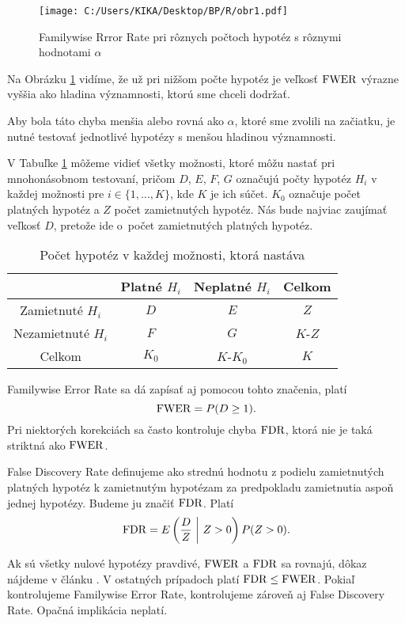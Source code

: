 \begin{figure}[h!]
  \centering
  \texttt{[image: C:/Users/KIKA/Desktop/BP/R/obr1.pdf]}
  \captionsetup{justification=centering}
  \caption{Familywise Rrror Rate pri rôznych počtoch hypotéz s rôznymi hodnotami $\alpha$}
  \label{obr02:1}
\end{figure}

Na Obrázku \ref{obr02:1} vidíme, že už pri nižšom počte hypotéz je veľkosť ${\rm FWER}$ 
výrazne vyššia ako hladina významnosti, ktorú sme chceli dodržať. 

Aby bola táto chyba menšia alebo rovná ako $\alpha$, ktoré sme zvolili na začiatku, 
je nutné testovať jednotlivé hypotézy s menšou hladinou významnosti. 

V Tabuľke \ref{tab02:1} môžeme vidieť všetky možnosti, ktoré môžu nastať pri mnohonásobnom testovaní, 
pričom $D$, $E$, $F$, $G$ označujú počty hypotéz $H_i$ v každej možnosti pre $i \in \{1, \dots, K\}$, kde $K$ je ich súčet. 
$K_0$ označuje počet platných hypotéz a $Z$ počet zamietnutých hypotéz. 
Nás bude najviac zaujímať veľkosť $D$, pretože ide o~počet zamietnutých platných hypotéz. 

\begin{table}[h!]
    \centering
    \begin{tabular}{|c|c|c|c|}
      \hline
       & Platné $H_i$ & Neplatné $H_i$ & Celkom \\ \hline
      Zamietnuté $H_i$ & $D$ & $E$ & $Z$ \\ \hline
      Nezamietnuté $H_i$ & $F$ & $G$ & $K$-$Z$ \\ \hline
      Celkom & $K_0$ & $K$-$K_0$ & $K$ \\ \hline
    \end{tabular}
    \captionsetup{justification=centering}
    \caption{Počet hypotéz v každej možnosti, ktorá nastáva}
    \label{tab02:1}
\end{table}

Familywise Error Rate sa dá zapísať aj pomocou tohto značenia, platí 
$$ {\rm FWER} = P (D \geq 1). $$ 
Pri niektorých korekciách sa často kontroluje chyba ${\rm FDR}$, ktorá nie je taká striktná ako ${\rm FWER}$. 

\begin{definicia}\label{def6}
  False Discovery Rate definujeme ako strednú hodnotu z podielu zamietnutých platných hypotéz k zamietnutým hypotézam  
  za predpokladu zamietnutia aspoň jednej hypotézy. Budeme ju značiť ${\rm FDR}$. 
  Platí 
  $$ {\rm FDR} = E \left( \frac{D}{Z} ~ \bigg| ~ Z>0 \right) P(Z>0). $$
\end{definicia}

Ak sú všetky nulové hypotézy pravdivé, ${\rm FWER}$ a ${\rm FDR}$ sa rovnajú, dôkaz nájdeme v článku \cite{Benjamini&Hochberg95}. 
V ostatných prípadoch platí ${\rm FDR} \leq {\rm FWER}$. 
Pokiaľ kontrolujeme Familywise Error Rate, kontrolujeme zároveň aj False Discovery Rate. 
Opačná implikácia neplatí. 
